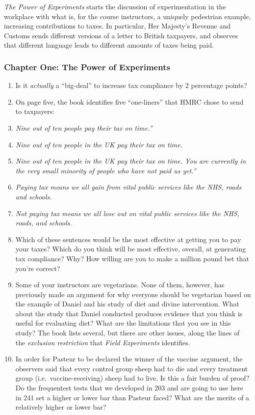 \documentclass[
]{article}
\providecommand{\tightlist}{%
  \setlength{\itemsep}{0pt}\setlength{\parskip}{0pt}}
\theoremstyle{definition}
\theoremstyle{definition}
\theoremstyle{definition}
\theoremstyle{definition}
\theoremstyle{remark}
\begin{document}
\emph{The Power of Experiments} starts the discussion of experimentation in the workplace with what is, for the course instructors, a uniquely pedestrian example, increasing contributions to taxes. In particular, Her Majesty's Revenue and Customs sends different versions of a letter to British taxpayers, and observes that different language leads to different amounts of taxes being paid.

\subsubsection{Chapter One: The Power of Experiments}\label{chapter-one-the-power-of-experiments}

\begin{enumerate}
\def\labelenumi{\arabic{enumi}.}
\tightlist
\item
  Is it \emph{actually} a ``big-deal'' to increase tax compliance by 2 percentage points?
\item
  On page five, the book identifies five ``one-liners'' that HMRC chose to send to taxpayers:
\item
  \emph{Nine out of ten people pay their tax on time.''}
\item
  \emph{Nine out of ten people in the UK pay their tax on time.}
\item
  \emph{Nine out of ten people in the UK pay their tax on time. You are currently in the very small minority of people who have not paid us yet.''}
\item
  \emph{Paying tax means we all gain from vital public services like the NHS, roads and schools.}
\item
  \emph{Not paying tax means we all lose out on vital public services like the NHS, roads, and schools.}
\item
  Which of these sentences would be the most effective at getting you to pay your taxes? Which do you think will be most effective, overall, at generating tax compliance? Why? How willing are you to make a million pound bet that you're correct?
\item
  Some of your instructors are vegetarians. None of them, however, has previously made an argument for why everyone should be vegetarian based on the example of Daniel and his study of diet and divine intervention. What about the study that Daniel conducted produces evidence that you think is useful for evaluating diet? What are the limitations that you see in this study? The book lists several, but there are other issues, along the lines of the \emph{exclusion restriction} that \emph{Field Experiments} identifies.
\item
  In order for Pasteur to be declared the winner of the vaccine argument, the observers said that every control group sheep had to die and every treatment group (i.e.~vaccine-receiving) sheep had to live. Is this a fair burden of proof? Do the frequentest tests that we developed in 203 and are going to use here in 241 set a higher or lower bar than Pasteur faced? What are the merits of a relatively higher or lower bar?
\end{enumerate}
\end{document}
